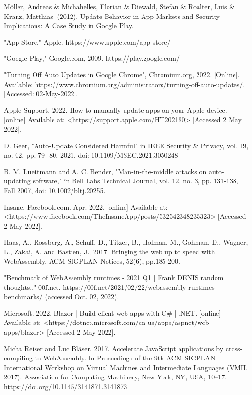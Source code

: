 \begin{thebibliography}{9}
Möller, Andreas \& Michahelles, Florian \& Diewald, Stefan \& Roalter, Luis \& Kranz, Matthias. (2012). Update Behavior in App Markets and Security Implications: A Case Study in Google Play.

"App Store," Apple. https://www.apple.com/app-store/

"Google Play," Google.com, 2009. https://play.google.com/

"Turning Off Auto Updates in Google Chrome", Chromium.org, 2022. [Online]. Available: https://www.chromium.org/administrators/turning-off-auto-updates/. [Accessed: 02-May-2022].

Apple Support. 2022. How to manually update apps on your Apple device. [online] Available at: <https://support.apple.com/HT202180> [Accessed 2 May 2022].

D. Geer, "Auto-Update Considered Harmful" in IEEE Security \& Privacy, vol. 19, no. 02, pp. 79- 80, 2021. doi: 10.1109/MSEC.2021.3050248

B. M. Luettmann and A. C. Bender, "Man-in-the-middle attacks on auto-updating software," in Bell Labs Technical Journal, vol. 12, no. 3, pp. 131-138, Fall 2007, doi: 10.1002/bltj.20255.

Insane, Facebook.com. Apr. 2022. [online] Available at: <https://www.facebook.com/TheInsaneApp/posts/532542348235323> [Accessed 2 May 2022].

Haas, A., Rossberg, A., Schuff, D., Titzer, B., Holman, M., Gohman, D., Wagner, L., Zakai, A. and Bastien, J., 2017. Bringing the web up to speed with WebAssembly. ACM SIGPLAN Notices, 52(6), pp.185-200.

"Benchmark of WebAssembly runtimes - 2021 Q1 | Frank DENIS random thoughts.," 00f.net. https://00f.net/2021/02/22/webassembly-runtimes-benchmarks/ (accessed Oct. 02, 2022).

Microsoft. 2022. Blazor | Build client web apps with C\# | .NET. [online] Available at: <https://dotnet.microsoft.com/en-us/apps/aspnet/web-apps/blazor> [Accessed 2 May 2022].

Micha Reiser and Luc Bläser. 2017. Accelerate JavaScript applications by cross-compiling to WebAssembly. In Proceedings of the 9th ACM SIGPLAN International Workshop on Virtual Machines and Intermediate Languages (VMIL 2017). Association for Computing Machinery, New York, NY, USA, 10–17. https://doi.org/10.1145/3141871.3141873


\end{thebibliography}
